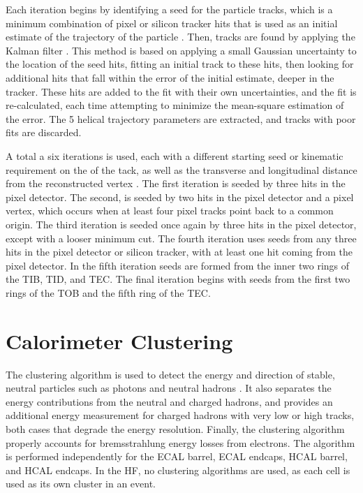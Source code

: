 \par Each iteration begins by identifying a seed for the particle
tracks, which is a minimum combination of pixel or silicon tracker
hits that is used as an initial estimate of the trajectory of the
particle \cite{Chatrchyan:2014fea}.  Then, tracks are found by applying
the Kalman filter \cite{Fruhwirth:1987fm}.  This method is based on
applying a small Gaussian uncertainty to the location of the seed
hits, fitting an initial track to these hits, then looking for
additional hits that fall within the error of the initial estimate,
deeper in the tracker.  These hits are added to the fit with their own
uncertainties, and the fit is re-calculated, each time attempting to
minimize the mean-square estimation of the error.  The 5 helical
trajectory parameters are extracted, and tracks with poor fits are
discarded.    

\par A total a six iterations is used, each with a different starting
seed or kinematic requirement on the \PT of the tack, as well as
the transverse and longitudinal distance from the reconstructed
vertex \cite{Fruhwirth:1987fm}.  The first iteration is seeded by
three hits in the pixel detector.  The second, is seeded by two hits
in the pixel detector and a pixel vertex, which occurs when at least
four pixel tracks point back to a common origin.  The third iteration
is seeded once again by three hits in the pixel detector, except with
a looser minimum \PT cut.  The fourth iteration uses seeds from any
three hits in the pixel detector or silicon tracker, with at least one
hit coming from the pixel detector.  In the fifth iteration seeds are
formed from the inner two rings of the TIB, TID, and TEC.  The final
iteration begins with seeds from the first two rings of the TOB and
the fifth ring of the TEC.   


\section{Calorimeter Clustering}
\label{calorimeter_clustering_overview}

\par The clustering algorithm is used to detect the energy and
direction of stable, neutral particles such as photons and neutral
hadrons \cite{CMS-PAS-PFT-09-001}.  It also separates the energy
contributions from the neutral and charged hadrons, and provides an
additional energy measurement for charged hadrons with very low or high
\PT tracks, both cases that degrade the energy resolution.  Finally,
the clustering algorithm properly accounts for bremsstrahlung energy
losses from electrons. The algorithm is performed independently for
the ECAL barrel, ECAL endcaps, HCAL barrel, and HCAL endcaps.  In the
HF, no clustering algorithms are used, as each cell is used as its own
cluster in an event.   

